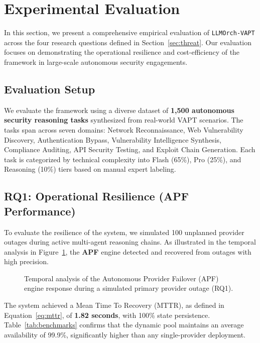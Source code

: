 \section{Experimental Evaluation}
\label{sec:evaluation}

In this section, we present a comprehensive empirical evaluation of \texttt{LLMOrch-VAPT} across the four research questions defined in Section~\ref{sec:threat}. Our evaluation focuses on demonstrating the operational resilience and cost-efficiency of the framework in large-scale autonomous security engagements.

\subsection{Evaluation Setup}
We evaluate the framework using a diverse dataset of \textbf{1,500 autonomous security reasoning tasks} synthesized from real-world VAPT scenarios. The tasks span across seven domains: Network Reconnaissance, Web Vulnerability Discovery, Authentication Bypass, Vulnerability Intelligence Synthesis, Compliance Auditing, API Security Testing, and Exploit Chain Generation. Each task is categorized by technical complexity into Flash (65\%), Pro (25\%), and Reasoning (10\%) tiers based on manual expert labeling.

\subsection{RQ1: Operational Resilience (APF Performance)}
To evaluate the resilience of the system, we simulated 100 unplanned provider outages during active multi-agent reasoning chains. As illustrated in the temporal analysis in Figure~\ref{fig:failover_timeline}, the \textbf{APF} engine detected and recovered from outages with high precision.

\begin{figure}[!t]
    \centering
    \resizebox{0.85\columnwidth}{!}{
        
    }
    \caption{Temporal analysis of the Autonomous Provider Failover (APF) engine response during a simulated primary provider outage (RQ1).}
    \label{fig:failover_timeline}
\end{figure}

The system achieved a Mean Time To Recovery (MTTR), as defined in Equation~\ref{eq:mttr}, of \textbf{1.82 seconds}, with 100\% state persistence. Table~\ref{tab:benchmarks} confirms that the dynamic pool maintains an average availability of 99.9\%, significantly higher than any single-provider deployment.

